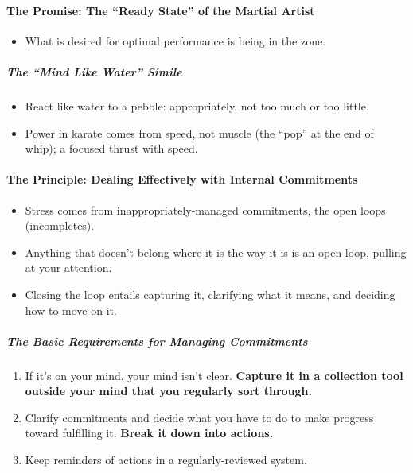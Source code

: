 \documentclass{article}
\begin{document}
\paragraph{The Promise: The ``Ready State'' of the Martial Artist}

\begin{itemize}
  \item What is desired for optimal performance is being in the zone.
\end{itemize}

\subparagraph{The ``Mind Like Water'' Simile}

\begin{itemize}
  \item React like water to a pebble: appropriately, not too much or too little.
  \item Power in karate comes from speed, not muscle (the ``pop'' at the end of whip); a focused thrust with speed.
\end{itemize}

\paragraph{The Principle: Dealing Effectively with Internal Commitments}

\begin{itemize}
  \item Stress comes from inappropriately-managed commitments, the open loops (incompletes).
  \item Anything that doesn't belong where it is the way it is is an open loop, pulling at your attention.
  \item Closing the loop entails capturing it, clarifying what it means, and deciding how to move on it.
\end{itemize}

\subparagraph{The Basic Requirements for Managing Commitments}

\begin{enumerate}
    \item If it's on your mind, your mind isn't clear. \textbf{Capture it in a collection tool outside your mind that you regularly sort through.}
    \item Clarify commitments and decide what you have to do to make progress toward fulfilling it. \textbf{Break it down into actions.}
    \item Keep reminders of actions in a regularly-reviewed system.
\end{enumerate}
\end{document}
